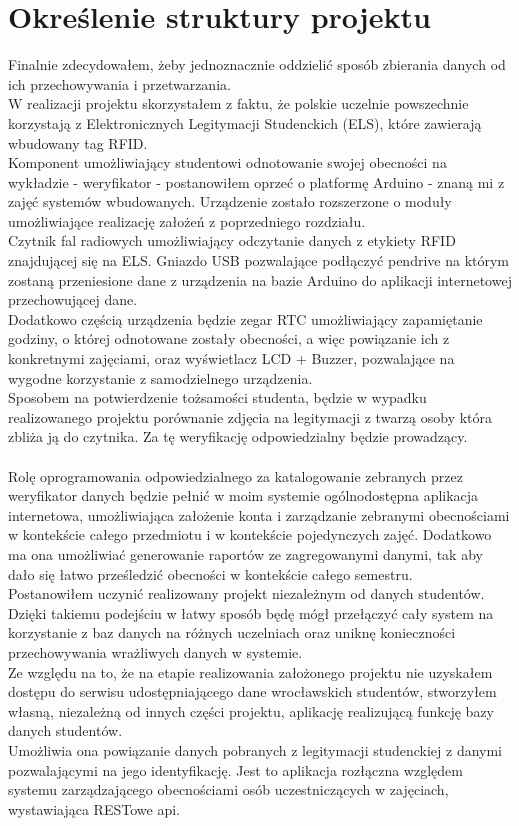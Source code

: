 \documentclass[declaration,shortabstract, mgr]{iithesis}
\begin{document}
\chapter{Określenie struktury projektu}
\indent Finalnie zdecydowałem, żeby jednoznacznie oddzielić sposób zbierania danych od ich przechowywania i przetwarzania.\\
\indent W realizacji projektu skorzystałem z faktu, że polskie uczelnie powszechnie korzystają z Elektronicznych Legitymacji Studenckich (ELS), które zawierają wbudowany tag RFID. \\
\indent Komponent umożliwiający studentowi odnotowanie swojej obecności na wykładzie - weryfikator - postanowiłem oprzeć o platformę Arduino - znaną mi z zajęć systemów wbudowanych. Urządzenie zostało rozszerzone o moduły umożliwiające realizację założeń z poprzedniego rozdziału. \\
\indent Czytnik fal radiowych umożliwiający odczytanie danych z etykiety RFID znajdującej się na ELS. Gniazdo USB pozwalające podłączyć pendrive na którym zostaną przeniesione dane z urządzenia na bazie Arduino do aplikacji internetowej przechowującej dane. \\ 
\indent Dodatkowo częścią urządzenia będzie zegar RTC umożliwiający zapamiętanie godziny, o której odnotowane zostały obecności, a więc powiązanie ich z konkretnymi zajęciami, oraz wyświetlacz LCD + Buzzer, pozwalające na wygodne korzystanie z samodzielnego urządzenia. \\
\indent Sposobem na potwierdzenie tożsamości studenta, będzie w wypadku realizowanego projektu porównanie zdjęcia na legitymacji z twarzą osoby która zbliża ją do czytnika. Za tę weryfikację odpowiedzialny będzie prowadzący.\\\\

\indent Rolę oprogramowania odpowiedzialnego za katalogowanie zebranych przez weryfikator danych będzie pełnić w moim systemie ogólnodostępna aplikacja internetowa, umożliwiająca założenie konta i zarządzanie zebranymi obecnościami w kontekście całego przedmiotu i w kontekście pojedynczych zajęć. Dodatkowo ma ona umożliwiać generowanie raportów ze zagregowanymi danymi, tak aby dało się łatwo prześledzić obecności w kontekście całego semestru. \\
\indent Postanowiłem uczynić realizowany projekt niezależnym od danych studentów. Dzięki takiemu podejściu w łatwy sposób będę mógł przełączyć cały system na korzystanie z baz danych na różnych uczelniach oraz uniknę konieczności przechowywania wrażliwych danych w systemie. \\
\indent Ze względu na to, że na etapie realizowania założonego projektu nie uzyskałem dostępu do serwisu udostępniającego dane wrocławskich studentów, stworzyłem własną, niezależną od innych części projektu, aplikację realizującą funkcję bazy danych studentów. \\
\indent Umożliwia ona powiązanie danych pobranych z legitymacji studenckiej z danymi pozwalającymi na jego identyfikację. Jest to aplikacja rozłączna względem systemu zarządzającego obecnościami osób uczestniczących w zajęciach, wystawiająca RESTowe api.
\end{document}

